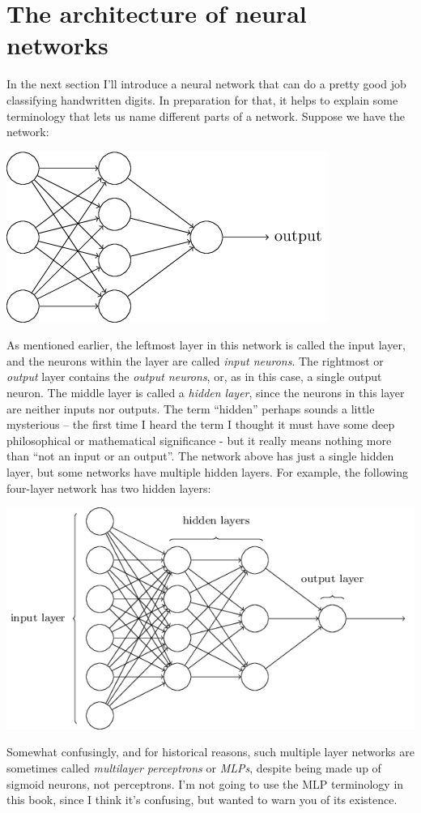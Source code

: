 \documentclass[a4paper,twoside,10pt]{book}
\begin{document}
\section{The architecture of neural networks}
In the next section I'll introduce a neural network that can do a pretty good job classifying handwritten digits. In preparation for that, it helps to explain some terminology that lets us name different parts of a network. Suppose we have the network:

\begin{center}
	\includegraphics[scale=0.5]{./figures/ch1/tikz10}
\end{center}

As mentioned earlier, the leftmost layer in this network is called the input layer, and the neurons within the layer are called \textit{input neurons}. The rightmost or \textit{output} layer contains the \textit{output neurons}, or, as in this case, a single output neuron. The middle layer is called a \textit{hidden layer}, since the neurons in this layer are neither inputs nor outputs. The term ``hidden'' perhaps sounds a little mysterious -- the first time I heard the term I thought it must have some deep philosophical or mathematical significance - but it really means nothing more than ``not an input or an output''. The network above has just a single hidden layer, but some networks have multiple hidden layers. For example, the following four-layer network has two hidden layers:

\begin{center}
	\includegraphics[scale=0.5]{./figures/ch1/tikz11}
\end{center}
Somewhat confusingly, and for historical reasons, such multiple layer networks are sometimes called \textit{multilayer perceptrons} or \textit{MLPs}, despite being made up of sigmoid neurons, not perceptrons. I'm not going to use the MLP terminology in this book, since I think it's confusing, but wanted to warn you of its existence.
\end{document}
